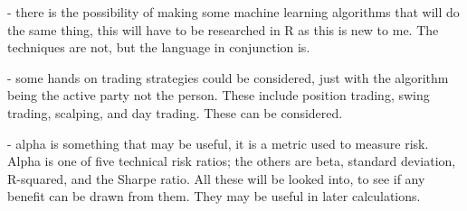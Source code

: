 \documentclass[12pt,a4paper]{article}
\begin{document}
- there is the possibility of making some machine learning algorithms that will do the same thing, this will have to be researched in R as this is new to me. The techniques are not, but the language in conjunction is.

- some hands on trading strategies could be considered, just with the algorithm being the active party not the person. These include position trading, swing trading, scalping, and day trading. These can be considered.

- alpha is something that may be useful, it is a metric used to measure risk. Alpha is one of five technical risk ratios; the others are beta, standard deviation, R-squared, and the Sharpe ratio. All these will be looked into, to see if any benefit can be drawn from them. They may be useful in later calculations.
\fi
\end{document}
